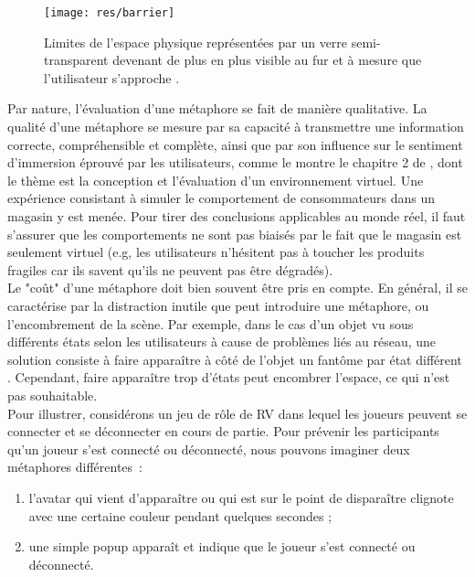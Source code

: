 \documentclass[11pt]{article}
\begin{document}
\begin{figure}
\centering
\texttt{[image: res/barrier]}
\caption{\label{fig:barrier}Limites de l'espace physique représentées par un verre semi-transparent devenant de plus en plus visible au fur et à mesure que l'utilisateur s'approche \cite{barrier}.}
\end{figure}

Par nature, l'évaluation d'une métaphore se fait de manière qualitative. La qualité d'une métaphore se mesure par sa capacité à transmettre une information correcte, compréhensible et complète, ainsi que par son influence sur le sentiment d'immersion éprouvé par les utilisateurs, comme le montre le chapitre 2 de \cite{trv2}, dont le thème est la conception et l'évaluation d'un environnement virtuel. Une expérience consistant à simuler le comportement de consommateurs dans un magasin y est menée. Pour tirer des conclusions applicables au monde réel, il faut s'assurer que les comportements ne sont pas biaisés par le fait que le magasin est seulement virtuel (e.g, les utilisateurs n'hésitent pas à toucher les produits fragiles car ils savent qu'ils ne peuvent pas être dégradés).
\\

Le "coût" d'une métaphore doit bien souvent être pris en compte. En général, il se caractérise par la distraction inutile que peut introduire une métaphore, ou l'encombrement de la scène. Par exemple, dans le cas d'un objet vu sous différents états selon les utilisateurs à cause de problèmes liés au réseau, une solution consiste à faire apparaître à côté de l'objet un fantôme par état différent \cite{network-errors}. Cependant, faire apparaître trop d'états peut encombrer l'espace, ce qui n'est pas souhaitable.
\\

Pour illustrer, considérons un jeu de rôle de RV dans lequel les joueurs peuvent se connecter et se déconnecter en cours de partie. Pour prévenir les participants qu'un joueur s'est connecté ou déconnecté, nous pouvons imaginer deux métaphores différentes~:
\begin{enumerate}
	\item l'avatar qui vient d'apparaître ou qui est sur le point de disparaître clignote avec une certaine couleur pendant quelques secondes ;
	\item une simple popup apparaît et indique que le joueur s'est connecté ou déconnecté.
\end{enumerate}
\end{document}
